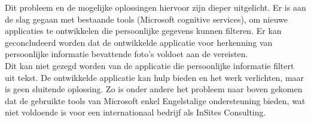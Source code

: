Dit probleem en de mogelijke oplossingen hiervoor zijn dieper uitgelicht. Er is aan de slag gegaan met bestaande tools (Microsoft cognitive services), om nieuwe applicaties te ontwikkelen die persoonlijke gegevens kunnen filteren. Er kan geconcludeerd worden dat de ontwikkelde applicatie voor herkenning van persoonlijke informatie bevattende foto's voldoet aan de vereisten. \\ 
Dit kan niet gezegd worden van de applicatie die persoonlijke informatie filtert uit tekst. De ontwikkelde applicatie kan hulp bieden en het werk verlichten, maar is geen sluitende oplossing.
Zo is onder andere het probleem naar boven gekomen dat de gebruikte tools van Microsoft enkel Engelstalige ondersteuning bieden, wat niet voldoende is voor een internationaal bedrijf als InSites Consulting. 

 



